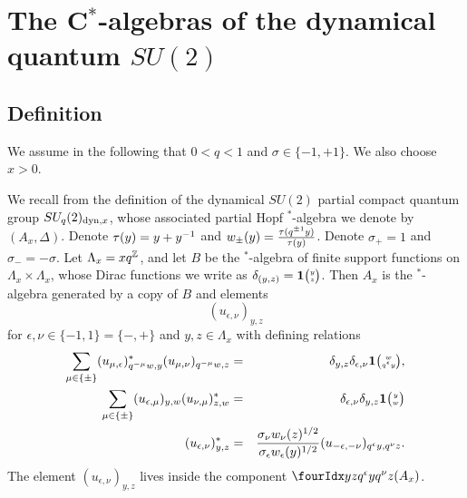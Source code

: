 


\section{The C$^*$-algebras of the dynamical quantum $SU(2)$}\label{SecUni}

\subsection{Definition}

We assume in the following that $0<q<1$ and $\sigma \in \{-1,+1\}$. We also choose $x>0$.

We recall from \cite{DCT1} the definition of the dynamical $SU(2)$ partial compact quantum group $SU_q(2)_{\operatorname{\mathrm{dyn}},x}$, whose associated partial Hopf $^*$-algebra we denote by $(A_x,\Delta)$. Denote $\operatorname{\tau}(y) = y+y^{-1}$ and $w_{\pm}(y) = \frac{\operatorname{\tau}(q^{\pm 1}y)}{\operatorname{\tau}(y)}$. Denote $\sigma_+ = 1$ and $\sigma_- = -\sigma$. Let $\Lambda_x = xq^{\mathbb{Z}}$, and let $B$ be the $^*$-algebra of finite support functions on $\Lambda_x\times \Lambda_x$, whose Dirac functions we write as $\delta_{(y,z)}=\mathbf{1}{\tiny {\begin{pmatrix} y\\z\end{pmatrix}}}$. Then $A_x$ is the $^*$-algebra generated by a copy of $B$ and elements \[(u_{\epsilon,\nu})_{y,z}\] for $\epsilon,\nu\in \{-1,1\}=\{-,+\}$ and $y,z\in \Lambda_x$ with defining relations \begin{eqnarray*} \sum_{\mu\in \{\pm\}} (u_{\mu,\epsilon})_{q^{-\mu}w,y}^* (u_{\mu,\nu})_{q^{-\mu}w,z}&=& \delta_{y,z} \delta_{\epsilon,\nu} \mathbf{1}{\tiny {\begin{pmatrix} w\\q^{\epsilon}y\end{pmatrix}}},\\ \sum_{\mu\in \{\pm\}} (u_{\epsilon,\mu})_{y,w} (u_{\nu,\mu})_{z,w}^* &=& \delta_{\epsilon,\nu}\delta_{y,z} \mathbf{1}{\tiny {\begin{pmatrix} y\\w\end{pmatrix}}} \\ (u_{\epsilon,\nu})_{y,z}^* &=& \frac{\sigma_{\nu}w_{\nu}(z)^{1/2}}{\sigma_{\epsilon}w_{\epsilon}(y)^{1/2}} (u_{-\epsilon,-\nu})_{q^{\epsilon}y,q^{\nu}z}.\end{eqnarray*} The element $(u_{\epsilon,\nu})_{y,z}$ lives inside the component $\Gr{(A_x)}{y}{q^{\epsilon}y}{z}{q^{\nu}z}$.

